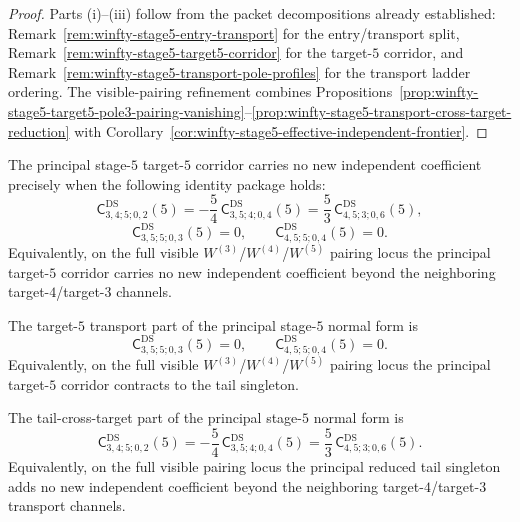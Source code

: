 \begin{proof}
Parts \textup{(i)}--\textup{(iii)} follow from the packet decompositions already established:
Remark~\ref{rem:winfty-stage5-entry-transport} for the entry/transport split,
Remark~\ref{rem:winfty-stage5-target5-corridor} for the target-$5$ corridor,
and Remark~\ref{rem:winfty-stage5-transport-pole-profiles} for the transport ladder ordering.
The visible-pairing refinement combines
Propositions~\ref{prop:winfty-stage5-target5-pole3-pairing-vanishing}--\ref{prop:winfty-stage5-transport-cross-target-reduction}
with Corollary~\ref{cor:winfty-stage5-effective-independent-frontier}.
\end{proof}

\begin{proposition}
\label{prop:winfty-stage5-principal-target5-no-new-independent-data}
\ClaimStatusConditional{}
The principal stage-$5$ target-$5$ corridor carries no new independent
coefficient precisely when the following identity package holds:
\[
\mathsf{C}^{\mathrm{DS}}_{3,4;5;0,2}(5)
=
-\frac{5}{4}\,\mathsf{C}^{\mathrm{DS}}_{3,5;4;0,4}(5)
=
\frac{5}{3}\,\mathsf{C}^{\mathrm{DS}}_{4,5;3;0,6}(5),
\]
\[
\mathsf{C}^{\mathrm{DS}}_{3,5;5;0,3}(5)=0,
\qquad
\mathsf{C}^{\mathrm{DS}}_{4,5;5;0,4}(5)=0.
\]
Equivalently, on the full visible
\texorpdfstring{$W^{(3)}$}{W3}/\texorpdfstring{$W^{(4)}$}{W4}/\texorpdfstring{$W^{(5)}$}{W5}
pairing locus the principal target-$5$ corridor carries no new
independent coefficient beyond the neighboring target-$4$/target-$3$
channels.
\end{proposition}

\begin{proposition}
\label{prop:winfty-stage5-principal-target5-transport-vanishing}
\ClaimStatusConditional{}
The target-$5$ transport part of the principal stage-$5$ normal form is
\[
\mathsf{C}^{\mathrm{DS}}_{3,5;5;0,3}(5)=0,
\qquad
\mathsf{C}^{\mathrm{DS}}_{4,5;5;0,4}(5)=0.
\]
Equivalently, on the full visible
\texorpdfstring{$W^{(3)}$}{W3}/\texorpdfstring{$W^{(4)}$}{W4}/\texorpdfstring{$W^{(5)}$}{W5}
pairing locus the principal target-$5$ corridor contracts to the tail
singleton.
\end{proposition}

\begin{proposition}
\label{prop:winfty-stage5-principal-tail-cross-target-reduction}
\ClaimStatusConditional{}
The tail-cross-target part of the principal stage-$5$ normal form is
\[
\mathsf{C}^{\mathrm{DS}}_{3,4;5;0,2}(5)
=
-\frac{5}{4}\,\mathsf{C}^{\mathrm{DS}}_{3,5;4;0,4}(5)
=
\frac{5}{3}\,\mathsf{C}^{\mathrm{DS}}_{4,5;3;0,6}(5).
\]
Equivalently, on the full visible pairing locus the principal reduced
tail singleton adds no new independent coefficient beyond the
neighboring target-$4$/target-$3$ transport channels.
\end{proposition}

